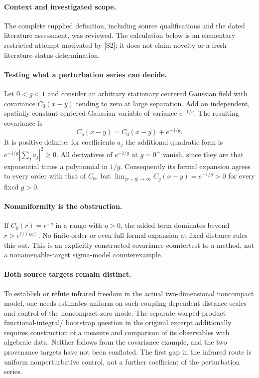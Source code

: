 \documentclass[11pt]{article}
\begin{document}
\paragraph{Context and investigated scope.} The complete supplied definition, including source qualifications and the dated literature assessment, was reviewed. The calculation below is an elementary restricted attempt motivated by [S2]; it does not claim novelty or a fresh literature-status determination.

\paragraph{Testing what a perturbation series can decide.} Let $0<g<1$ and consider an arbitrary stationary centered Gaussian field with covariance $C_0(x-y)$ tending to zero at large separation. Add an independent, spatially constant centered Gaussian variable of variance $e^{-1/g}$. The resulting covariance is
\[
 C_g(x-y)=C_0(x-y)+e^{-1/g}.
\]
It is positive definite: for coefficients $a_j$ the additional quadratic form is $e^{-1/g}|\sum_ja_j|^2\geq0$. All derivatives of $e^{-1/g}$ at $g=0^+$ vanish, since they are that exponential times a polynomial in $1/g$. Consequently its formal expansion agrees to every order with that of $C_0$, but $\lim_{|x-y|\to\infty}C_g(x-y)=e^{-1/g}>0$ for every fixed $g>0$.

\paragraph{Nonuniformity is the obstruction.} If $C_0(r)=r^{-\eta}$ in a range with $\eta>0$, the added term dominates beyond $r>e^{1/(\eta g)}$. No finite-order or even full formal expansion at fixed distance rules this out. This is an explicitly constructed covariance countertest to a method, not a nonamenable-target sigma-model counterexample.

\paragraph{Both source targets remain distinct.} To establish or refute infrared freedom in the actual two-dimensional noncompact model, one needs estimates uniform on such coupling-dependent distance scales and control of the noncompact zero mode. The separate warped-product functional-integral/ bootstrap question in the original excerpt additionally requires construction of a measure and comparison of its observables with algebraic data. Neither follows from the covariance example, and the two provenance targets have not been conflated. The first gap in the infrared route is uniform nonperturbative control, not a further coefficient of the perturbation series.
\end{document}
